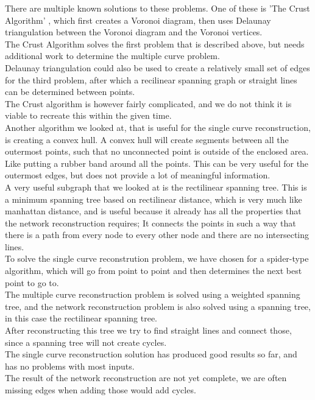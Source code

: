 \documentclass[11pt]{article}
\begin{document}
There are multiple known solutions to these problems. One of these is 'The Crust Algorithm' \cite{crust}, which first creates a Voronoi diagram, then uses Delaunay triangulation between the Voronoi diagram and the Voronoi vertices.\\
The Crust Algorithm solves the first problem that is described above, but needs additional work to determine the multiple curve problem.\\
Delaunay triangulation could also be used to create a relatively small set of edges for the third problem, after which a recilinear spanning graph or straight lines can be determined between points.\\
The Crust algorithm is however fairly complicated, and we do not think it is viable to recreate this within the given time.\\
Another algorithm we looked at, that is useful for the single curve reconstruction, is creating a convex hull. A convex hull will create segments between all the outermost points, such that no unconnected point is outside of the enclosed area. Like putting a rubber band around all the points. This can be very useful for the outermost edges, but does not provide a lot of meaningful information.\\
A very useful subgraph that we looked at is the rectilinear spanning tree. This is a minimum spanning tree based on rectilinear distance, which is very much like manhattan distance, and is useful because it already has all the properties that the network reconstruction requires; It connects the points in such a way that there is a path from every node to every other node and there are no intersecting lines. \\

To solve the single curve reconstrution problem, we have chosen for a spider-type algorithm, which will go from point to point and then determines the next best point to go to.\\
The multiple curve reconstruction problem is solved using a weighted spanning tree, and the network reconstruction problem is also solved using a spanning tree, in this case the rectilinear spanning tree.\\
After reconstructing this tree we try to find straight lines and connect those, since a spanning tree will not create cycles.\\
The single curve reconstruction solution has produced good results so far, and has no problems with most inputs.\\
The result of the network reconstruction are not yet complete, we are often missing edges when adding those would add cycles.\\
\end{document}
